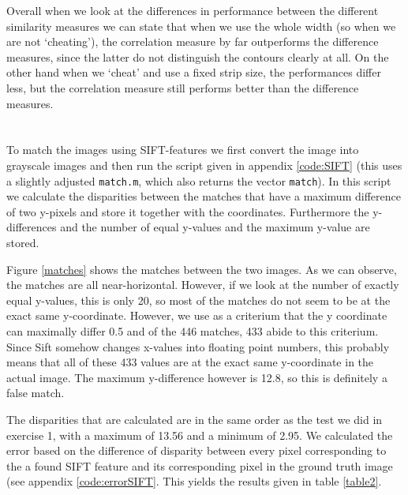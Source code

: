 \documentclass{article}
\begin{document}
Overall when we look at the differences in performance between the different similarity measures we can state that when we use the whole width (so when we are not `cheating'), the correlation measure by far outperforms the difference measures, since the latter do not distinguish the contours clearly at all. On the other hand when we `cheat' and use a fixed strip size, the performances differ less, but the correlation measure still performs better than the difference measures. 

\section{}
\section{}
To match the images using SIFT-features we first convert the image into grayscale images and then run the script given in appendix \ref{code:SIFT} (this uses a slightly adjusted \texttt{match.m}, which also returns the vector \texttt{match}). In this script we calculate the disparities between the matches that have a maximum difference of two y-pixels and store it together with the coordinates. Furthermore the y-differences and the number of equal y-values and the maximum y-value are stored.

Figure \ref{matches} shows the matches between the two images. As we can observe, the matches are all near-horizontal. However, if we look at the number of exactly equal y-values, this is only 20, so most of the matches do not seem to be at the exact same y-coordinate. However, we use as a criterium that the y coordinate can maximally differ 0.5 and of the 446 matches, 433 abide to this criterium. Since Sift somehow changes x-values into floating point numbers, this probably means that all of these 433 values are at the exact same y-coordinate in the actual image. The maximum y-difference however is 12.8, so this is definitely a false match.

The disparities that are calculated are in the same order as the test we did in exercise 1, with a maximum of 13.56 and a minimum of 2.95. We calculated the error based on the difference of disparity between every pixel corresponding to the a found SIFT feature and its corresponding pixel in the ground truth image (see appendix \ref{code:errorSIFT}. This yields the results given in table \ref{table2}. 
\end{document}

